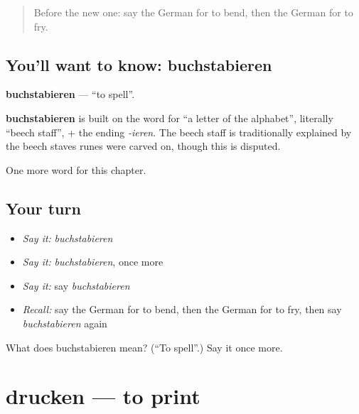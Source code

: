 \label{lesson:GE-C177-buchstabieren}



\begin{quote}
Before the new one: say the German for to bend, then the German for to fry.
\end{quote}

\subsection*{You'll want to know: buchstabieren}
\textbf{buchstabieren} — \textquotedblleft{}to spell\textquotedblright{}.

\begin{cousinweb}
\textbf{buchstabieren} is built on the word for \textquotedblleft{}a letter of the alphabet\textquotedblright{}, literally \textquotedblleft{}beech staff\textquotedblright{}, + the ending \emph{-ieren}. The beech staff is traditionally explained by the beech staves runes were carved on, though this is disputed.
\end{cousinweb}

\begin{grammarlens}[title={What you've built}]
One more word for this chapter.
\end{grammarlens}

\subsection*{Your turn}
\begin{itemize}
\raggedright
  \item \emph{Say it:} \emph{buchstabieren}
  \item \emph{Say it:} \emph{buchstabieren}, once more
  \item \emph{Say it:} say \emph{buchstabieren}
  \item \emph{Recall:} say the German for to bend, then the German for to fry, then say \emph{buchstabieren} again
\end{itemize}

\begin{tcolorbox}[breakable,colback=teal!4,colframe=teal!35!black,title={Before you move on}]
What does buchstabieren mean? (\textquotedblleft{}To spell\textquotedblright{}.) Say it once more.
\end{tcolorbox}
\section[drucken]{drucken — to print}

